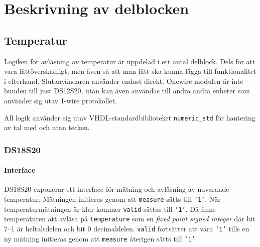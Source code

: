 \documentclass[a4paper]{scrreprt}
\begin{document}
\newcommand{\signal}[1] {\texttt{#1}}
\newcommand{\state}[1] {\textbf{#1}}
\newcommand{\ohm} {$\Omega$}
\newcommand{\us} {$\mathrm{\mu s}$}
\newcommand{\tos} {$\rightarrow$}
\newcommand {\high} {\signal{'1'}}
\newcommand {\low} {\signal{'0'}}
\newcommand {\Tx} {T\textsubscript{x}}
\newcommand {\Rx} {R\textsubscript{x}}
\newcommand {\fullref}[1] {\ref{#1} \nameref{#1}}
\newcommand{\degcel}{\ensuremath{^\circ}C}


\section{Beskrivning av delblocken}
\subsection{Temperatur}\label{sec:temperatur}
Logiken för avläsning av temperatur är uppdelad i ett antal delblock. Dels för att vara lättöverskådligt, men även så att man lätt ska kunna lägga till funktionalitet i efterhand. Slutanvändaren använder endast  direkt. Onewire modulen är inte bunden till just DS12S20, utan kan även användas till andra andra enheter som använder sig utav 1-wire protokollet.

All logik använder sig utav VHDL-standardbiblioteket \signal{numeric\_std} för hantering av tal med och utan tecken.

\subsubsection{DS18S20}\label{sec:ds18s20}
\paragraph{Interface}
DS18S20 exponerar ett interface för mätning och avläsning av nuvarande temperatur. Mätningen initieras genom att \signal{measure} sätts till \signal{'1'}. När temperaturmätningen är klar kommer \signal{valid} sättas till \signal{'1'}.
Då finns temperaturen att avläsa på \signal{temperature} som en \textit{fixed point signed integer} där bit 7--1 är heltalsdelen och bit 0 decimaldelen.
\signal{valid} fortsätter att vara \signal{'1'} tills en ny mätning initieras genom att \signal{measure} återigen sätts till \signal{'1'}.
\end{document}
